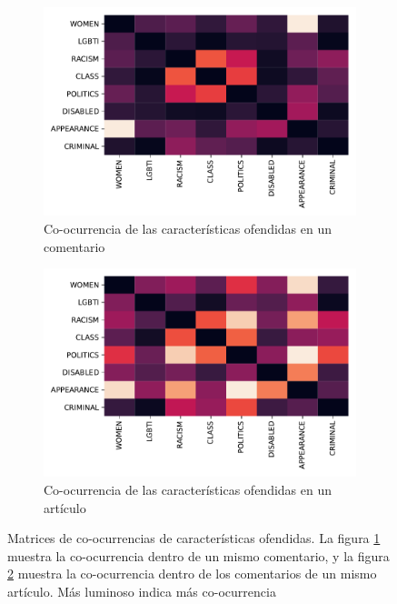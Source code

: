 \begin{figure}[t]
    \centering
    \begin{subfigure}[]{0.49\textwidth}
        \includegraphics[width=\textwidth]{img/05/heatmap_characteristics.pdf}
        \caption{Co-ocurrencia de las características ofendidas en un comentario}
        \label{subfig:heatmap_characteristics_comment}
    \end{subfigure}
    \begin{subfigure}[]{0.49\textwidth}
        \centering
        \includegraphics[width=\textwidth]{img/05/heatmap_characteristics_article.pdf}
        \caption{Co-ocurrencia de las características ofendidas en un artículo}
        \label{subfig:heatmap_characteristics_article}
    \end{subfigure}

    \caption{Matrices de co-ocurrencias de características ofendidas. La figura \ref{subfig:heatmap_characteristics_comment} muestra la co-ocurrencia dentro de un mismo comentario, y la figura \ref{subfig:heatmap_characteristics_article} muestra la co-ocurrencia dentro de los comentarios de un mismo artículo. Más luminoso indica más co-ocurrencia}
    \label{fig:heatmap_characteristics}
\end{figure}


